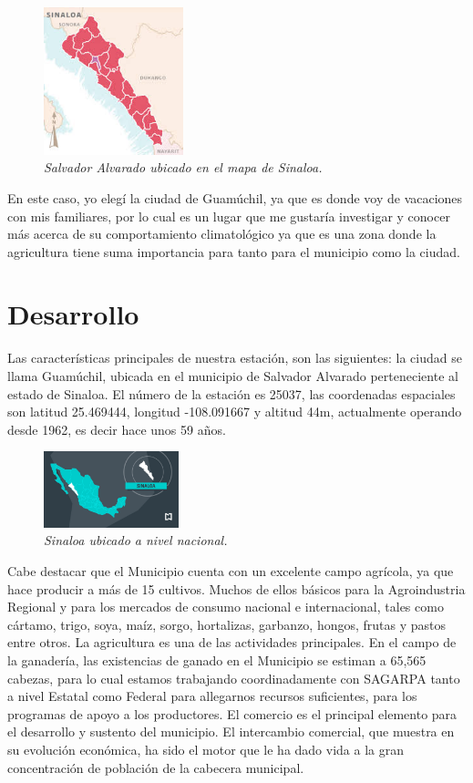 \documentclass[12pt]{article}
\begin{document}
\begin{figure} 
    \includegraphics[width=0.36\textwidth]{Salvarado.jpg}
    \caption{\textit{Salvador Alvarado ubicado en el mapa de Sinaloa.}}
\end{figure}

En este caso, yo elegí la ciudad de Guamúchil, ya que es donde voy de vacaciones con mis familiares, por lo cual es un lugar que me gustaría investigar y conocer más acerca de su comportamiento climatológico ya que es una zona donde la agricultura tiene suma importancia para tanto para el municipio como la ciudad.

\section{Desarrollo}
	Las características principales de nuestra estación, son las siguientes: la ciudad se llama Guamúchil, ubicada en el municipio de Salvador Alvarado perteneciente al estado de Sinaloa. El número de la estación es 25037, las coordenadas espaciales son latitud 25.469444, longitud -108.091667 y altitud 44m, actualmente operando desde 1962, es decir hace unos 59 años. 
    
\begin{figure} 
\includegraphics[width=0.35\textwidth]{Sinaloa.jpg}
\caption{\textit{Sinaloa ubicado a nivel nacional.}}
\end{figure}
    
    Cabe destacar que el Municipio cuenta con un excelente campo agrícola, ya que hace producir a más de 15 cultivos. Muchos de ellos básicos para la Agroindustria Regional y para los mercados de consumo nacional e internacional, tales como cártamo, trigo, soya, maíz, sorgo, hortalizas, garbanzo, hongos, frutas y pastos entre otros. La agricultura es una de las actividades principales. En el campo de la ganadería, las existencias de ganado en el Municipio se estiman a 65,565 cabezas, para lo cual estamos trabajando coordinadamente con SAGARPA tanto a nivel Estatal como Federal para allegarnos recursos suficientes, para los programas de apoyo a los productores. El comercio es el principal elemento para el desarrollo y sustento del municipio. El intercambio comercial, que muestra en su evolución económica, ha sido el motor que le ha dado vida a la gran concentración de población de la cabecera municipal.
    
\end{document}
